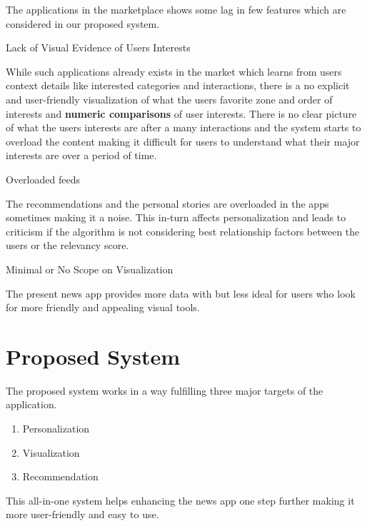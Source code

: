 The applications in the marketplace shows some lag in few features which are considered in our proposed system.
\begin{enumerate}


{ \bf  \large \item Lack of Visual Evidence of Users Interests}\newline
While such applications already exists in the market which learns from users context details like interested categories and interactions, there is a no explicit and user-friendly visualization of what the users favorite zone and order of interests and \textbf{numeric comparisons} of user interests. There is no clear picture of what the users interests are after a many interactions and the system starts to overload the content making it difficult for users to understand what their major interests are over a period of time.

 
{\bf \large \item   Overloaded feeds}\newline
The recommendations and the personal stories are overloaded in the apps sometimes making it a noise. This in-turn affects personalization and leads to criticism if the algorithm is not considering best relationship factors between the users or the relevancy score.

 {\bf \large \item   Minimal or No Scope on Visualization}\newline
The present news app provides more data with but less ideal for users who look for more friendly and appealing visual tools.
\end{enumerate}

\section {Proposed System}
The proposed system works in a way fulfilling three major targets of the application. 

\begin{enumerate}
    \item Personalization
    \item Visualization
    \item Recommendation
\end{enumerate}

This all-in-one system helps enhancing the news app one step further making it more user-friendly and easy to use.

